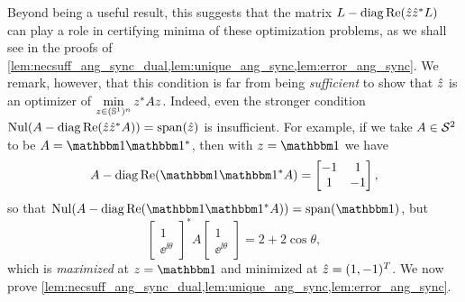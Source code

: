 Beyond being a useful result, this suggests that the matrix $L - \operatorname{diag}\operatorname{Re}(\hat{z}\hat{z}^* L)$ can play a role in certifying minima of these optimization problems, as we shall see in the proofs of \cref{lem:necsuff_ang_sync_dual,lem:unique_ang_sync,lem:error_ang_sync}.  We remark, however, that this condition is far from being \emph{sufficient} to show that $\hat{z}$ is an optimizer of $\min\limits_{z \in (\mathbb{S}^1)^n} z^* A z$.  Indeed, even the stronger condition $\operatorname{Nul}(A - \operatorname{diag}\operatorname{Re}(\hat{z}\hat{z}^* A)) = \operatorname{span}(\hat{z})$ is insufficient.  For example, if we take $A \in \mathcal{S}^2$ to be $A = \one \one^*$, then with $z = \one$ we have \[A - \diag \Re (\one \one^* A) = \begin{bmatrix} -1 & 1 \\ 1 & -1 \end{bmatrix},\] so that $\Nul(A - \diag \Re (\one \one^* A)) = \Span(\one)$, but \[\begin{bmatrix} 1 \\ \ee^{\ii \theta} \end{bmatrix}^* A \begin{bmatrix} 1 \\ \ee^{\ii \theta} \end{bmatrix} = 2 + 2 \cos \theta,\] which is \emph{maximized} at $z = \one$ and minimized at $\hat{z} = (1, -1)^T$.  We now prove \cref{lem:necsuff_ang_sync_dual,lem:unique_ang_sync,lem:error_ang_sync}.

